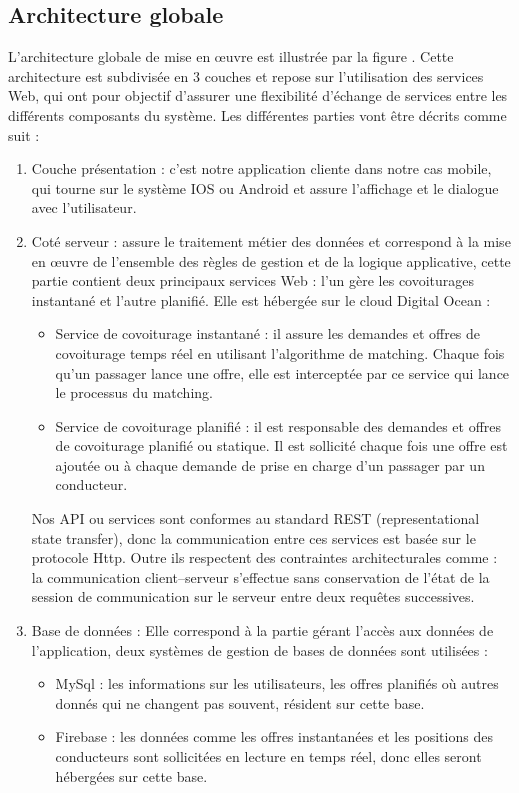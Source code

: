 \subsection{Architecture globale} %
\label{ssub:architecture_globale}
L’architecture globale de mise en œuvre est illustrée par la figure . Cette architecture est subdivisée en 3 couches et repose sur l’utilisation des services Web, qui ont pour objectif d’assurer une flexibilité d’échange de services entre les différents composants du système.\newline
Les différentes parties vont être décrits comme suit :
\begin{enumerate}
	\item Couche présentation : c'est notre application cliente dans notre cas mobile, qui tourne sur le système IOS ou Android et assure l'affichage et le dialogue avec l'utilisateur.
	\item Coté serveur : assure le traitement métier des données et correspond à la mise en œuvre de l'ensemble des règles de gestion et de la logique applicative, cette partie contient deux principaux services Web : l'un gère les covoiturages instantané et l'autre planifié. Elle est hébergée sur le cloud Digital Ocean :
	\begin{itemize}
		\item Service de covoiturage instantané : il assure les demandes et offres de covoiturage temps réel en utilisant l'algorithme de matching. Chaque fois qu'un passager lance une offre, elle est interceptée par ce service qui lance le processus du matching. 
		\item Service de covoiturage planifié : il est responsable des demandes et offres de covoiturage planifié ou statique. Il est sollicité chaque fois une offre est ajoutée ou à chaque demande de prise en charge d'un passager par un conducteur.
	\end{itemize}
	Nos API ou services sont conformes au standard REST (representational state transfer), donc la communication entre ces services est basée sur le protocole Http. Outre ils respectent des contraintes architecturales comme : la communication client–serveur s'effectue sans conservation de l'état de la session de communication sur le serveur entre deux requêtes successives.\cite{fielding2000architectural}
	\item Base de données : Elle correspond à la partie gérant l'accès aux données de l'application, deux systèmes de gestion de bases de données sont utilisées :
	\begin{itemize}
		\item MySql : les informations sur les utilisateurs, les offres planifiés où autres donnés qui ne changent pas souvent, résident sur cette base.
		\item Firebase : les données comme les offres instantanées et les positions des conducteurs sont sollicitées en lecture en temps réel, donc elles seront hébergées sur cette base.
	\end{itemize}
\end{enumerate}
\clearpage
